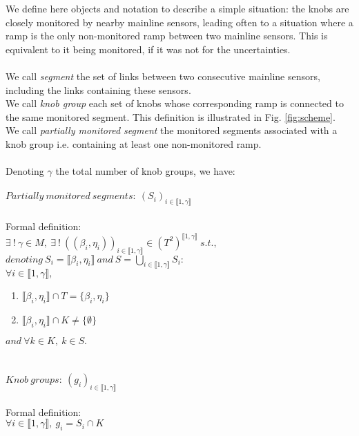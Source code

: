 We define here objects and notation to describe a simple situation: the knobs are closely monitored by nearby mainline sensors, leading often to a situation where a ramp is the only non-monitored ramp between two mainline sensors. This is equivalent to it being monitored, if it was not for the uncertainties.\\
\\
We call \emph{segment} the set of links between two consecutive mainline sensors, including the links containing these sensors. \\
We call \emph{knob group} each set of knobs whose corresponding ramp is connected to the same monitored segment.
This definition is illustrated in Fig. \ref{fig:scheme}.\\
We call \emph{partially monitored segment} the monitored segments associated with a knob group i.e. containing at least one non-monitored ramp.\\
\\
Denoting $\gamma$ the total number of knob groups, we have:\\
\\
$Partially\ monitored\ segments:\ (S_{i})_{i \in \llbracket 1,\gamma \rrbracket}$\\ 
\\
Formal definition:\\
$\exists\ !\ \gamma\in M,\ \exists\ !\ ((\beta_{i},\eta_{i}))_{i\in\llbracket 1,\gamma\rrbracket}\in (T^2)^{\llbracket 1,\gamma\rrbracket}\ s.t.,$\\
$denoting\ S_{i}=\llbracket \beta_{i},\eta_{i} \rrbracket\ and\ S=\underset{i\in \llbracket 1,\gamma \rrbracket}{\bigcup}  S_{i}:$\\
$\forall i\in\llbracket 1,\gamma \rrbracket,$
\begin{enumerate}
	\item $\llbracket \beta_{i},\eta_{i} \rrbracket \cap T=\{\beta_{i},\eta_{i}\}$
	\item $\llbracket \beta_{i}, \eta_{i} \rrbracket \cap K\not= \{\emptyset \}$
\end{enumerate}
$and\ \forall k\in K,\ k\in S.$\\
\\
\\
$Knob\ groups:\ (g_{i})_{i\in \llbracket 1,\gamma \rrbracket}$\\
\\
Formal definition:\\
$\forall i \in \llbracket 1, \gamma \rrbracket,\ g_{i}=S_{i} \cap K $\\
